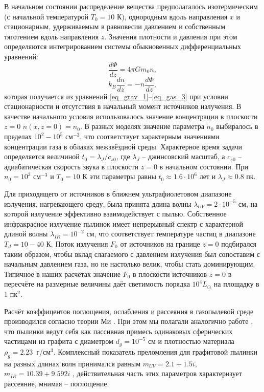 \documentclass[a4paper,11pt,twoside]{article}
\begin{document}
В начальном состоянии распределение вещества предполагалось изотермическим (с начальной температурой $T_0 = 10$ К), однородным вдоль направления $x$ и стационарным, удерживаемым в равновесии давлением и собственным тяготением вдоль направления $z$. Значения плотности и давления при этом определяются интегрированием системы обыкновенных дифференциальных уравнений:
\begin{equation}
\frac{d \Phi}{d z} = 4\pi G m_0 n,
\end{equation}
\begin{equation}
k_B \frac{d n}{d z} = -n \frac{d \Phi}{d z},
\end{equation}
которая получается из уравнений \eqref{eq_grav_1}--\eqref{eq_gas_3} при условии стационарности и отсутствия в начальный момент источников излучения. В качестве начального условия использовалось значение концентрации в плоскости $z=0$ $n(x, z=0) = n_0$. В разных моделях значение параметра $n_0$ выбиралось в пределах $10^2-10^5$ см$^{-3}$, что соответствует характерным значениями концентрации газа в облаках межзвёздной среды. Характерное время задачи определяется величиной $t_0 = \lambda_J/c_{s0}$, где $\lambda_J$ -- джинсовский масштаб, а $c_{s0}$ -- адиабатическая скорость звука в плоскости $z = 0$ в начальном состоянии. При $n_0 = 10^3$ см$^{-3}$ и $T_0 = 10$ К эти параметры равны
$t_0 \approx 1.6\cdot10^6$ лет и $\lambda_J \approx 0.8$ пк.

Для приходящего от источников в ближнем ультрафиолетовом диапазоне излучения, нагревающего среду, была принята длина волны $\lambda_{UV} = 2 \cdot 10^{-5}$ см, на которой излучение эффективно взаимодействует с пылью. Собственное инфракрасное излучение пылинок имеет непрерывный спектр с характерной длиной волны $\lambda_{IR} = 10^{-2}$ см, что соответствует температуре частиц в диапазоне $T_d = 10-40$ К. Поток излучения $F_0$ от источников на границе $z=0$ подбирался таким образом, чтобы вклад слагаемого с давлением излучения был сопоставим с начальным давлением газа, но не настолько велик, чтобы стать доминирующим. Типичное в наших расчётах значение $F_0$ в плоскости источников $z=0$ в пересчёте на размерные величины даёт светимость порядка $10^4 L_\odot$ на площадку в 1 пк$^2$.

Расчёт коэффицентов поглощения, ослабления и рассеяния в газопылевой среде производился согласно теории Ми \cite{Hulst1961}. При этом мы полагали аналогично работе \cite{Zhukova2012}, что пылинки ведут себя как пассивная примесь одинаковых сферических частицами из графита с диаметром $d_g = 10^{-5}$ см и плотностью материала $\rho_g = 2.23$~г/см$^3$. Комплексный показатель преломления для графитовой пылинки на разных длинах волн принимался равным $m_{UV} = 2.1 + 1.5i$, $m_{IR} = 10.39 + 9.592 i$  \cite{Michel1996}, действительная часть этих параметров характеризует рассеяние, мнимая -- поглощение.
\end{document}
